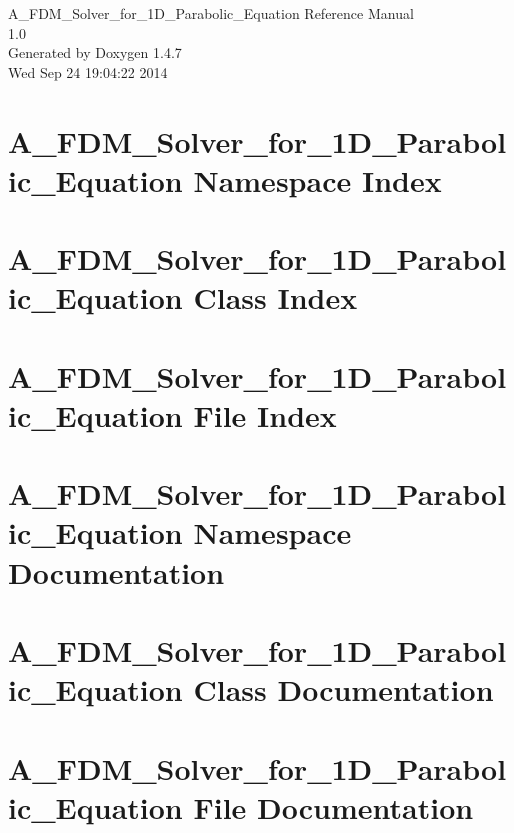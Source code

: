 \documentclass[a4paper]{book}
\begin{document}
\begin{titlepage}
\vspace*{7cm}
\begin{center}
{\Large A\_\-FDM\_\-Solver\_\-for\_\-1D\_\-Parabolic\_\-Equation Reference Manual\\[1ex]\large 1.0 }\\
\vspace*{1cm}
{\large Generated by Doxygen 1.4.7}\\
\vspace*{0.5cm}
{\small Wed Sep 24 19:04:22 2014}\\
\end{center}
\end{titlepage}
\clearemptydoublepage
{}
\tableofcontents
\clearemptydoublepage
{}
\chapter{A\_\-FDM\_\-Solver\_\-for\_\-1D\_\-Parabolic\_\-Equation Namespace Index}

\chapter{A\_\-FDM\_\-Solver\_\-for\_\-1D\_\-Parabolic\_\-Equation Class Index}

\chapter{A\_\-FDM\_\-Solver\_\-for\_\-1D\_\-Parabolic\_\-Equation File Index}

\chapter{A\_\-FDM\_\-Solver\_\-for\_\-1D\_\-Parabolic\_\-Equation Namespace Documentation}


\chapter{A\_\-FDM\_\-Solver\_\-for\_\-1D\_\-Parabolic\_\-Equation Class Documentation}



\chapter{A\_\-FDM\_\-Solver\_\-for\_\-1D\_\-Parabolic\_\-Equation File Documentation}







\printindex
\end{document}
